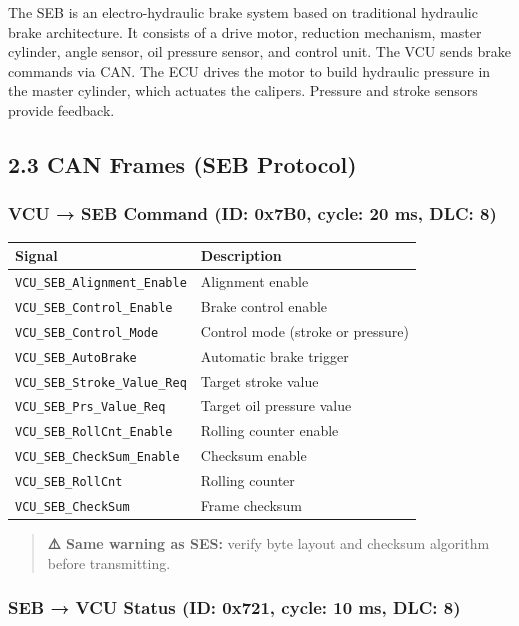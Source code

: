 \documentclass[12pt,a4paper,oneside]{report}
\begin{document}
The SEB is an electro-hydraulic brake system based on traditional hydraulic
brake architecture. It consists of a drive motor, reduction mechanism, master
cylinder, angle sensor, oil pressure sensor, and control unit. The VCU sends
brake commands via CAN. The ECU drives the motor to build hydraulic pressure in
the master cylinder, which actuates the calipers. Pressure and stroke sensors
provide feedback.

\subsection{2.3 CAN Frames (SEB Protocol)}\label{can-frames-seb-protocol}

\subsubsection{VCU → SEB Command (ID: 0x7B0, cycle: 20 ms, DLC:
8)}\label{vcu-seb-command-id-0x7b0-cycle-20-ms-dlc-8}

\begin{longtable}[]{@{}ll@{}}
\toprule\noalign{}
Signal & Description \\
\midrule\noalign{}
\endhead
\bottomrule\noalign{}
\endlastfoot
\texttt{VCU\_SEB\_Alignment\_Enable} & Alignment enable \\
\texttt{VCU\_SEB\_Control\_Enable} & Brake control enable \\
\texttt{VCU\_SEB\_Control\_Mode} & Control mode (stroke or pressure) \\
\texttt{VCU\_SEB\_AutoBrake} & Automatic brake trigger \\
\texttt{VCU\_SEB\_Stroke\_Value\_Req} & Target stroke value \\
\texttt{VCU\_SEB\_Prs\_Value\_Req} & Target oil pressure value \\
\texttt{VCU\_SEB\_RollCnt\_Enable} & Rolling counter enable \\
\texttt{VCU\_SEB\_CheckSum\_Enable} & Checksum enable \\
\texttt{VCU\_SEB\_RollCnt} & Rolling counter \\
\texttt{VCU\_SEB\_CheckSum} & Frame checksum \\
\end{longtable}

\begin{quote}
\textbf{⚠️ Same warning as SES:} verify byte layout and checksum algorithm
before transmitting.
\end{quote}

\subsubsection{SEB → VCU Status (ID: 0x721, cycle: 10 ms, DLC:
8)}\label{seb-vcu-status-id-0x721-cycle-10-ms-dlc-8}
\end{document}
